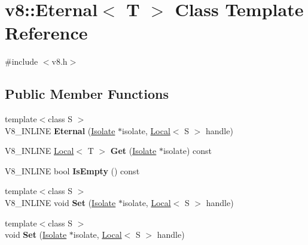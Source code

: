 \hypertarget{classv8_1_1Eternal}{}\section{v8\+:\+:Eternal$<$ T $>$ Class Template Reference}
\label{classv8_1_1Eternal}


{\ttfamily \#include $<$v8.\+h$>$}

\subsection*{Public Member Functions}
\begin{DoxyCompactItemize}
\item 
\mbox{\label{classv8_1_1Eternal_ad7522d8b51e072dcbc4261bc1f155bcb}} 
{\footnotesize template$<$class S $>$ }\\V8\+\_\+\+I\+N\+L\+I\+NE {\bfseries Eternal} (\mbox{\hyperlink{classv8_1_1Isolate}{Isolate}} $\ast$isolate, \mbox{\hyperlink{classv8_1_1Local}{Local}}$<$ S $>$ handle)
\item 
\mbox{\label{classv8_1_1Eternal_a2a615f9cdc8ae38d2380065488c2a397}} 
V8\+\_\+\+I\+N\+L\+I\+NE \mbox{\hyperlink{classv8_1_1Local}{Local}}$<$ T $>$ {\bfseries Get} (\mbox{\hyperlink{classv8_1_1Isolate}{Isolate}} $\ast$isolate) const
\item 
\mbox{\label{classv8_1_1Eternal_a7548826960a4f34ee36947f4fa3765d7}} 
V8\+\_\+\+I\+N\+L\+I\+NE bool {\bfseries Is\+Empty} () const
\item 
\mbox{\label{classv8_1_1Eternal_a75a32f5c428a0d47e13f66dbdeb9adba}} 
{\footnotesize template$<$class S $>$ }\\V8\+\_\+\+I\+N\+L\+I\+NE void {\bfseries Set} (\mbox{\hyperlink{classv8_1_1Isolate}{Isolate}} $\ast$isolate, \mbox{\hyperlink{classv8_1_1Local}{Local}}$<$ S $>$ handle)
\item 
\mbox{\label{classv8_1_1Eternal_a2f9dcec02b2c2f7d4b55aee0d8b9881a}} 
{\footnotesize template$<$class S $>$ }\\void {\bfseries Set} (\mbox{\hyperlink{classv8_1_1Isolate}{Isolate}} $\ast$isolate, \mbox{\hyperlink{classv8_1_1Local}{Local}}$<$ S $>$ handle)
\end{DoxyCompactItemize}


